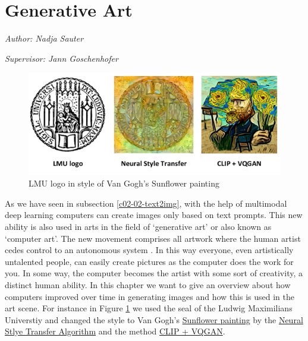 \documentclass[
]{krantz}
\begin{document}
\hypertarget{c03-04-usecase}{%
\section{Generative Art}\label{c03-04-usecase}}

\emph{Author: Nadja Sauter}

\emph{Supervisor: Jann Goschenhofer}

\begin{figure}

{\centering \includegraphics[width=0.9\linewidth]{./figures/03-chapter3/Logo} 

}

\caption{LMU logo in style of Van Gogh's Sunflower painting}\label{fig:Logo}
\end{figure}



As we have seen in subsection \ref{c02-02-text2img}, with the help of multimodal deep learning computers can create images only based on text prompts. This new ability is also used in arts in the field of `generative art' or also known as `computer art'. The new movement comprises all artwork where the human artist cedes control to an autonomous system \citep{galanter2016generative}. In this way everyone, even artistically untalented people, can easily create pictures as the computer does the work for you. In some way, the computer becomes the artist with some sort of creativity, a distinct human ability. In this chapter we want to give an overview about how computers improved over time in generating images and how this is used in the art scene. For instance in Figure \ref{fig:Logo} we used the seal of the Ludwig Maximilians Universtiy and changed the style to Van Gogh's \href{https://wallpaperaccess.com/full/787825.jpg}{Sunflower painting} by the \href{https://www.tensorflow.org/tutorials/generative/style_transfer}{Neural Stlye Transfer Algorithm} and the method \href{https://colab.research.google.com/drive/1ZAus_gn2RhTZWzOWUpPERNC0Q8OhZRTZ\#scrollTo=FhhdWrSxQhwg}{CLIP + VQGAN}.
\end{document}
